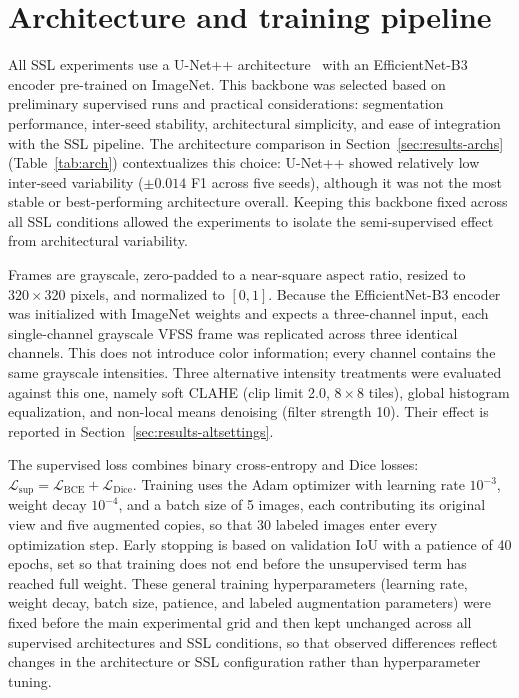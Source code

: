 \documentclass[
  msc,
  american
]{ThesisPUC_v2}
\begin{document}
\section{Architecture and training pipeline}
\label{sec:method-architecture}

All SSL experiments use a U-Net++ architecture~\citep{ref_unetpp} with an EfficientNet-B3 encoder pre-trained on ImageNet. This backbone was selected based on preliminary supervised runs and practical considerations: segmentation performance, inter-seed stability, architectural simplicity, and ease of integration with the SSL pipeline. The architecture comparison in Section~\ref{sec:results-archs} (Table~\ref{tab:arch}) contextualizes this choice: U-Net++ showed relatively low inter-seed variability ($\pm 0.014$ F1 across five seeds), although it was not the most stable or best-performing architecture overall. Keeping this backbone fixed across all SSL conditions allowed the experiments to isolate the semi-supervised effect from architectural variability.

Frames are grayscale, zero-padded to a near-square aspect ratio, resized to $320 \times 320$ pixels, and normalized to $[0, 1]$. Because the EfficientNet-B3 encoder was initialized with ImageNet weights and expects a three-channel input, each single-channel grayscale VFSS frame was replicated across three identical channels. This does not introduce color information; every channel contains the same grayscale intensities. Three alternative intensity treatments were evaluated against this one, namely soft CLAHE (clip limit 2.0, $8 \times 8$ tiles), global histogram equalization, and non-local means denoising (filter strength 10). Their effect is reported in Section~\ref{sec:results-altsettings}.

The supervised loss combines binary cross-entropy and Dice losses: $\mathcal{L}_{\text{sup}} = \mathcal{L}_{\text{BCE}} + \mathcal{L}_{\text{Dice}}$. Training uses the Adam optimizer with learning rate $10^{-3}$, weight decay $10^{-4}$, and a batch size of 5 images, each contributing its original view and five augmented copies, so that 30 labeled images enter every optimization step. Early stopping is based on validation IoU with a patience of 40 epochs, set so that training does not end before the unsupervised term has reached full weight. These general training hyperparameters (learning rate, weight decay, batch size, patience, and labeled augmentation parameters) were fixed before the main experimental grid and then kept unchanged across all supervised architectures and SSL conditions, so that observed differences reflect changes in the architecture or SSL configuration rather than hyperparameter tuning.
\end{document}
